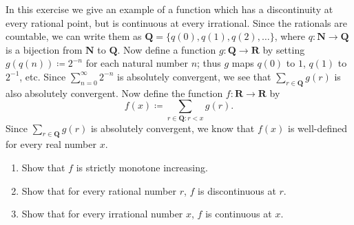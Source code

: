 \begin{exercise}\label{ex 9.8.5}
    In this exercise we give an example of a function which has a discontinuity at every rational point, but is continuous at every irrational.
    Since the rationals are countable, we can write them as \(\mathbf{Q} = \{q(0), q(1), q(2), \dots\}\), where \(q : \mathbf{N} \to \mathbf{Q}\) is a bijection from \(\mathbf{N}\) to \(\mathbf{Q}\).
    Now define a function \(g : \mathbf{Q} \to \mathbf{R}\) by setting \(g(q(n)) \coloneqq 2^{-n}\) for each natural number \(n\);
    thus \(g\) maps \(q(0)\) to \(1\), \(q(1)\) to \(2^{-1}\), etc.
    Since \(\sum_{n = 0}^\infty 2^{-n}\) is absolutely convergent, we see that \(\sum_{r \in \mathbf{Q}} g(r)\) is also absolutely convergent.
    Now define the function \(f : \mathbf{R} \to \mathbf{R}\) by
    \[
        f(x) \coloneqq \sum_{r \in \mathbf{Q} : r < x} g(r).
    \]
    Since \(\sum_{r \in \mathbf{Q}} g(r)\) is absolutely convergent, we know that \(f(x)\) is well-defined for every real number \(x\).
    \begin{enumerate}
        \item Show that \(f\) is strictly monotone increasing.
        \item Show that for every rational number \(r\), \(f\) is discontinuous at \(r\).
        \item Show that for every irrational number \(x\), \(f\) is continuous at \(x\).
    \end{enumerate}
\end{exercise}